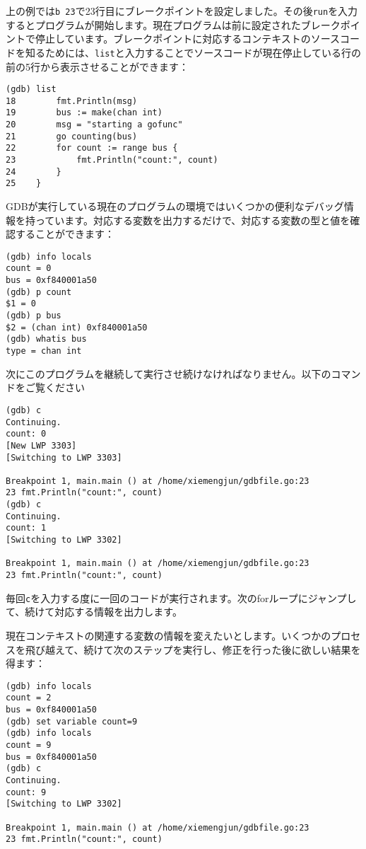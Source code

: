 上の例では\texttt{b 23}で23行目にブレークポイントを設定しました。その後\texttt{run}を入力するとプログラムが開始します。現在プログラムは前に設定されたブレークポイントで停止しています。ブレークポイントに対応するコンテキストのソースコードを知るためには、\texttt{list}と入力することでソースコードが現在停止している行の前の5行から表示させることができます：



\begin{lstlisting}[numbers=none]
(gdb) list
18        fmt.Println(msg)
19        bus := make(chan int)
20        msg = "starting a gofunc"
21        go counting(bus)
22        for count := range bus {
23            fmt.Println("count:", count)
24        }
25    }
\end{lstlisting}

GDBが実行している現在のプログラムの環境ではいくつかの便利なデバッグ情報を持っています。対応する変数を出力するだけで、対応する変数の型と値を確認することができます：


\begin{lstlisting}[numbers=none]
(gdb) info locals
count = 0
bus = 0xf840001a50
(gdb) p count
$1 = 0
(gdb) p bus
$2 = (chan int) 0xf840001a50
(gdb) whatis bus
type = chan int
\end{lstlisting}

次にこのプログラムを継続して実行させ続けなければなりません。以下のコマンドをご覧ください

\begin{lstlisting}[numbers=none]
(gdb) c
Continuing.
count: 0
[New LWP 3303]
[Switching to LWP 3303]

Breakpoint 1, main.main () at /home/xiemengjun/gdbfile.go:23
23 fmt.Println("count:", count)
(gdb) c
Continuing.
count: 1
[Switching to LWP 3302]

Breakpoint 1, main.main () at /home/xiemengjun/gdbfile.go:23
23 fmt.Println("count:", count)
\end{lstlisting}

毎回\texttt{c}を入力する度に一回のコードが実行されます。次のforループにジャンプして、続けて対応する情報を出力します。

現在コンテキストの関連する変数の情報を変えたいとします。いくつかのプロセスを飛び越えて、続けて次のステップを実行し、修正を行った後に欲しい結果を得ます：

\begin{lstlisting}[numbers=none]
(gdb) info locals
count = 2
bus = 0xf840001a50
(gdb) set variable count=9
(gdb) info locals
count = 9
bus = 0xf840001a50
(gdb) c
Continuing.
count: 9
[Switching to LWP 3302]

Breakpoint 1, main.main () at /home/xiemengjun/gdbfile.go:23
23 fmt.Println("count:", count)        
\end{lstlisting}

